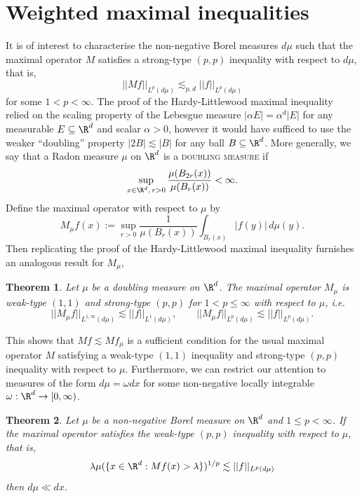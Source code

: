 \documentclass[reqno]{amsart}
\newtheorem{theorem}{Theorem}
\theoremstyle{definition}
\theoremstyle{remark}
\renewcommand{\emph}{\textsc}
\begin{document}
\section{Weighted maximal inequalities}

It is of interest to characterise the non-negative Borel measures $d \mu$ such that the maximal operator $M$ satisfies a strong-type $(p, p)$ inequality with respect to $d \mu$, that is, 
	\[ ||M f||_{L^p (d \mu)} \lesssim_{p, d} ||f||_{L^p (d\mu)} \]
for some $1 < p < \infty$. The proof of the Hardy-Littlewood maximal inequality relied on the scaling property of the Lebesgue measure $|\alpha E| = \alpha^d |E|$ for any measurable $E \subseteq \R^d$ and scalar $\alpha > 0$, however it would have sufficed to use the weaker ``doubling'' property $|2 B| \lesssim |B|$ for any ball $B \subseteq \R^d$. More generally, we say that a Radon measure $\mu$ on $\R^d$ is a \emph{doubling measure} if
	\[ \sup_{x \in \R^d,  \, r > 0} \frac{\mu(B_{2r} (x))}{\mu(B_r (x))} < \infty. \]
Define the maximal operator with respect to $\mu$ by 
	\[ M_\mu f(x) := \sup_{r > 0} \frac{1}{\mu(B_r (x))} \int_{B_r (x)} |f(y)| \, d \mu(y).\]
Then replicating the proof of the Hardy-Littlewood maximal inequality furnishes an analogous result for $M_\mu$, 

\begin{theorem}
	Let $\mu$ be a doubling measure on $\R^d$. The maximal operator $M_\mu$ is	weak-type $(1, 1)$ and strong-type $(p, p)$ for $1 < p \leq \infty$ with respect to $\mu$, i.e.
	\[ ||M_\mu f||_{L^{1, \infty} (d \mu)} \lesssim ||f||_{L^1 (d\mu)}, \qquad ||M_\mu f||_{L^{p}(d \mu)} \lesssim ||f||_{L^p (d\mu)}. \]\label{thm:maxdouble}
\end{theorem}	
This shows that $M f \lesssim Mf_\mu$ is a sufficient condition for the usual maximal operator $M$ satisfying a weak-type $(1, 1)$ inequality and strong-type $(p, p)$ inequality with respect to $\mu$. Furthermore, we can restrict our attention to measures of the form $d \mu = \omega dx$ for some non-negative locally integrable $\omega : \R^d \to [0, \infty)$. 

\begin{theorem}
	Let $\mu$ be a non-negative Borel measure on $\R^d$ and $1 \leq p < \infty$. If the maximal operator satisfies the weak-type $(p, p)$ inequality with respect to $\mu$, that is, 
		\[ \lambda \mu(\{ x \in \R^d : Mf (x) > \lambda \})^{1/p} \lesssim ||f||_{L^p (d\mu)} \]
	then $d\mu  \ll d x$. 	
\end{theorem}
\end{document}

